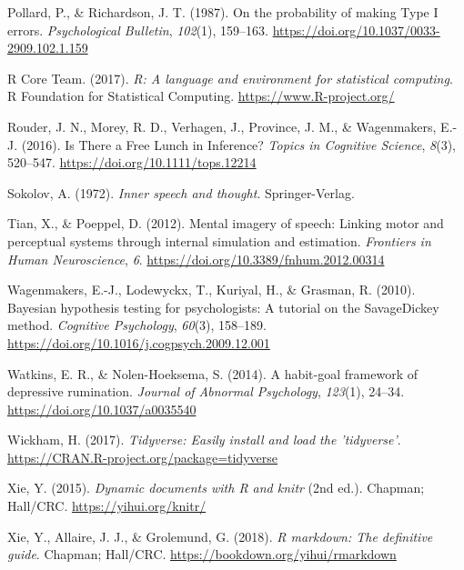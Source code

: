 \documentclass[
  english,
  man, donotrepeattitle,floatsintext]{apa6}
\newlength{\cslhangindent}
\newenvironment{cslreferences}%
  {\setlength{\parindent}{0pt}%
  \everypar{\setlength{\hangindent}{\cslhangindent}}\ignorespaces}%
  {\par}
\begin{document}
\begin{cslreferences}
\leavevmode\hypertarget{ref-pollard_probability_1987}{}%
Pollard, P., \& Richardson, J. T. (1987). On the probability of making Type I errors. \emph{Psychological Bulletin}, \emph{102}(1), 159--163. \url{https://doi.org/10.1037/0033-2909.102.1.159}

\leavevmode\hypertarget{ref-R-base}{}%
R Core Team. (2017). \emph{R: A language and environment for statistical computing}. R Foundation for Statistical Computing. \url{https://www.R-project.org/}

\leavevmode\hypertarget{ref-rouder_is_2016}{}%
Rouder, J. N., Morey, R. D., Verhagen, J., Province, J. M., \& Wagenmakers, E.-J. (2016). Is There a Free Lunch in Inference? \emph{Topics in Cognitive Science}, \emph{8}(3), 520--547. \url{https://doi.org/10.1111/tops.12214}

\leavevmode\hypertarget{ref-sokolov_inner_1972}{}%
Sokolov, A. (1972). \emph{Inner speech and thought}. Springer-Verlag.

\leavevmode\hypertarget{ref-tian_mental_2012}{}%
Tian, X., \& Poeppel, D. (2012). Mental imagery of speech: Linking motor and perceptual systems through internal simulation and estimation. \emph{Frontiers in Human Neuroscience}, \emph{6}. \url{https://doi.org/10.3389/fnhum.2012.00314}

\leavevmode\hypertarget{ref-wagenmakers_bayesian_2010}{}%
Wagenmakers, E.-J., Lodewyckx, T., Kuriyal, H., \& Grasman, R. (2010). Bayesian hypothesis testing for psychologists: A tutorial on the SavageDickey method. \emph{Cognitive Psychology}, \emph{60}(3), 158--189. \url{https://doi.org/10.1016/j.cogpsych.2009.12.001}

\leavevmode\hypertarget{ref-watkins_habit-goal_2014}{}%
Watkins, E. R., \& Nolen-Hoeksema, S. (2014). A habit-goal framework of depressive rumination. \emph{Journal of Abnormal Psychology}, \emph{123}(1), 24--34. \url{https://doi.org/10.1037/a0035540}

\leavevmode\hypertarget{ref-R-tidyverse}{}%
Wickham, H. (2017). \emph{Tidyverse: Easily install and load the 'tidyverse'}. \url{https://CRAN.R-project.org/package=tidyverse}

\leavevmode\hypertarget{ref-R-knitr}{}%
Xie, Y. (2015). \emph{Dynamic documents with R and knitr} (2nd ed.). Chapman; Hall/CRC. \url{https://yihui.org/knitr/}

\leavevmode\hypertarget{ref-R-rmarkdown}{}%
Xie, Y., Allaire, J. J., \& Grolemund, G. (2018). \emph{R markdown: The definitive guide}. Chapman; Hall/CRC. \url{https://bookdown.org/yihui/rmarkdown}
\end{cslreferences}
\end{document}
